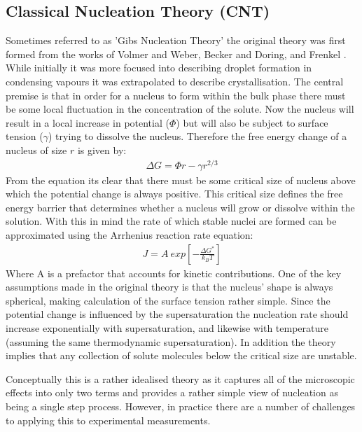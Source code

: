 \documentclass[a4paper,oneside,11pt]{book}
\begin{document}
\subsection{Classical Nucleation Theory (CNT)}
Sometimes referred to as 'Gibs Nucleation Theory' the original theory was first formed from the works of Volmer and Weber, Becker and Doring, and Frenkel \cite{Frenkel1939, Volmer1926}. While initially it was more focused into describing droplet formation in condensing vapours it was extrapolated to describe crystallisation. The central premise is that in order for a nucleus to form within the bulk phase there must be some local fluctuation in the concentration of the solute. Now the nucleus will result in a local increase in potential ($\Phi$) but will also be subject to surface tension ($\gamma$) trying to dissolve the nucleus. Therefore the free energy change of a nucleus of size $r$ is given by:
\begin{align}
	\Delta G = \Phi r - \gamma r^{2/3}
\end{align}
From the equation its clear that there must be some critical size of nucleus above which the potential change is always positive. This critical size defines the free energy barrier that determines whether a nucleus will grow or dissolve within the solution. With this in mind the rate of which stable nuclei are formed can be approximated using the Arrhenius reaction rate equation:
\begin{align}
	J = A \ exp \left[-\frac{\Delta G^*}{k_BT} \right]
\end{align}
Where A is a prefactor that accounts for kinetic contributions. One of the key assumptions made in the original theory is that the nucleus' shape is always spherical, making calculation of the surface tension rather simple. Since the potential change is influenced by the supersaturation the nucleation rate should increase exponentially with supersaturation, and likewise with temperature (assuming the same thermodynamic supersaturation). In addition the theory implies that any collection of solute molecules below the critical size are unstable.  

Conceptually this is a rather idealised theory as it captures all of the microscopic effects into only two terms and provides a rather simple view of nucleation as being a single step process. However, in practice there are a number of challenges to applying this to experimental measurements.
\end{document}
